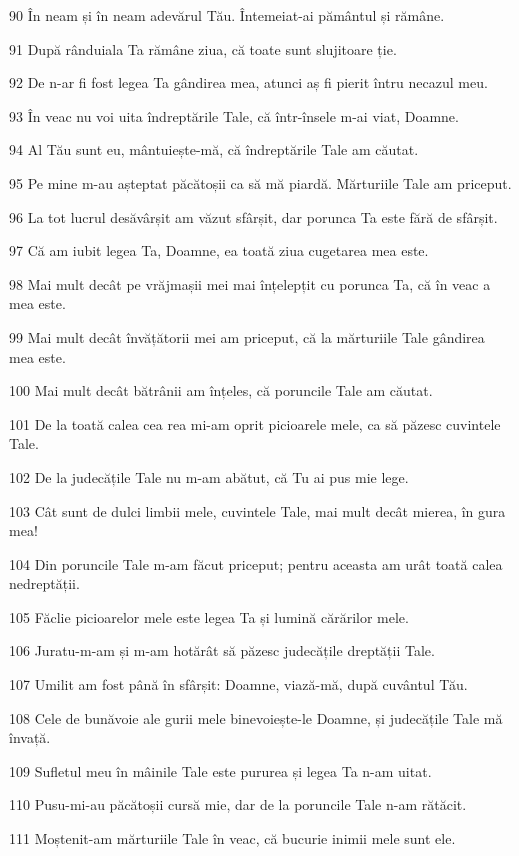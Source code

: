 \par 90 În neam și în neam adevărul Tău. Întemeiat-ai pământul și rămâne.
\par 91 După rânduiala Ta rămâne ziua, că toate sunt slujitoare ție.
\par 92 De n-ar fi fost legea Ta gândirea mea, atunci aș fi pierit întru necazul meu.
\par 93 În veac nu voi uita îndreptările Tale, că într-însele m-ai viat, Doamne.
\par 94 Al Tău sunt eu, mântuiește-mă, că îndreptările Tale am căutat.
\par 95 Pe mine m-au așteptat păcătoșii ca să mă piardă. Mărturiile Tale am priceput.
\par 96 La tot lucrul desăvârșit am văzut sfârșit, dar porunca Ta este fără de sfârșit.
\par 97 Că am iubit legea Ta, Doamne, ea toată ziua cugetarea mea este.
\par 98 Mai mult decât pe vrăjmașii mei mai înțelepțit cu porunca Ta, că în veac a mea este.
\par 99 Mai mult decât învățătorii mei am priceput, că la mărturiile Tale gândirea mea este.
\par 100 Mai mult decât bătrânii am înțeles, că poruncile Tale am căutat.
\par 101 De la toată calea cea rea mi-am oprit picioarele mele, ca să păzesc cuvintele Tale.
\par 102 De la judecățile Tale nu m-am abătut, că Tu ai pus mie lege.
\par 103 Cât sunt de dulci limbii mele, cuvintele Tale, mai mult decât mierea, în gura mea!
\par 104 Din poruncile Tale m-am făcut priceput; pentru aceasta am urât toată calea nedreptății.
\par 105 Făclie picioarelor mele este legea Ta și lumină cărărilor mele.
\par 106 Juratu-m-am și m-am hotărât să păzesc judecățile dreptății Tale.
\par 107 Umilit am fost până în sfârșit: Doamne, viază-mă, după cuvântul Tău.
\par 108 Cele de bunăvoie ale gurii mele binevoiește-le Doamne, și judecățile Tale mă învață.
\par 109 Sufletul meu în mâinile Tale este pururea și legea Ta n-am uitat.
\par 110 Pusu-mi-au păcătoșii cursă mie, dar de la poruncile Tale n-am rătăcit.
\par 111 Moștenit-am mărturiile Tale în veac, că bucurie inimii mele sunt ele.
